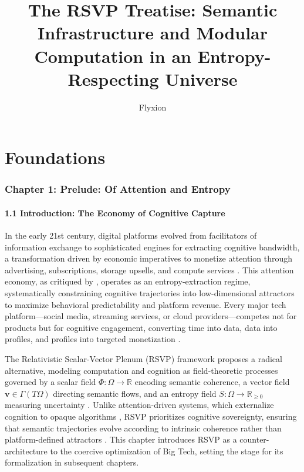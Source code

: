 \documentclass[12pt]{article}
\title{The RSVP Treatise: Semantic Infrastructure and Modular Computation in an Entropy-Respecting Universe}
\author{Flyxion}
\date{}
\begin{document}
\maketitle

\tableofcontents

\part{Foundations}

\section{Chapter 1: Prelude: Of Attention and Entropy}

\subsection{1.1 Introduction: The Economy of Cognitive Capture}

In the early 21st century, digital platforms evolved from facilitators of information exchange to sophisticated engines for extracting cognitive bandwidth, a transformation driven by economic imperatives to monetize attention through advertising, subscriptions, storage upsells, and compute services \citep{zuboff2019}. This attention economy, as critiqued by \citet{lanier2018}, operates as an entropy-extraction regime, systematically constraining cognitive trajectories into low-dimensional attractors to maximize behavioral predictability and platform revenue. Every major tech platform—social media, streaming services, or cloud providers—competes not for products but for cognitive engagement, converting time into data, data into profiles, and profiles into targeted monetization \citep{zuboff2019}.

The Relativistic Scalar-Vector Plenum (RSVP) framework proposes a radical alternative, modeling computation and cognition as field-theoretic processes governed by a scalar field \(\Phi: \Omega \to \mathbb{R}\) encoding semantic coherence, a vector field \(\mathbf{v} \in \Gamma(T\Omega)\) directing semantic flows, and an entropy field \(S: \Omega \to \mathbb{R}_{\geq 0}\) measuring uncertainty \citep{shannon1948, jaynes2003}. Unlike attention-driven systems, which externalize cognition to opaque algorithms \citep{ortega1957}, RSVP prioritizes cognitive sovereignty, ensuring that semantic trajectories evolve according to intrinsic coherence rather than platform-defined attractors \citep{deleuze1987}. This chapter introduces RSVP as a counter-architecture to the coercive optimization of Big Tech, setting the stage for its formalization in subsequent chapters.
\end{document}
